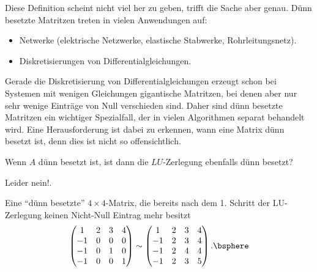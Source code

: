 Diese Definition scheint nicht viel her zu geben, 
trifft die Sache aber genau.
Dünn besetzte Matritzen treten in vielen Anwendungen auf:
\begin{itemize}
  \item Netwerke (elektrische Netzwerke, elastische Stabwerke,
  Rohrleitungsnetz).
  \item Diskretisierungen von Differentialgleichungen.
\end{itemize}
Gerade die Diskretisierung von Differentialgleichungen erzeugt schon bei
Systemen mit wenigen Gleichungen gigantische Matritzen, bei denen aber nur sehr
wenige Einträge von Null verschieden sind. Daher sind dünn besetzte Matritzen
ein wichtiger Spezialfall, der in vielen Algorithmen separat behandelt wird.
Eine Herausforderung ist dabei zu erkennen, wann eine Matrix dünn besetzt ist,
denn dies ist nicht so offensichtlich.

 \begin{bemn}[Frage:] Wenn $A$ dünn
besetzt ist, ist dann die $LU$-Zerlegung ebenfalls dünn besetzt?
\end{bemn}
\begin{bemn}[Antwort.]
Leider nein!.
\end{bemn}
\begin{bspn} Eine ``dünn besetzte'' $4\times 4$-Matrix, die bereits nach dem 1.
Schritt der LU-Zerlegung keinen Nicht-Null Eintrag mehr besitzt
\begin{align*}
\begin{pmatrix}
1 & 2 & 3 & 4\\
-1 & 0 & 0 & 0\\
-1 & 0 & 1 & 0\\
-1 & 0 & 0 & 1
\end{pmatrix}
\sim
\begin{pmatrix}
1 & 2 & 3 & 4\\
-1 & 2 & 3 & 4\\
-1 & 2 & 4 & 4\\
-1 & 2 & 3 & 5
\end{pmatrix}.\bsphere
\end{align*}
\end{bspn}

